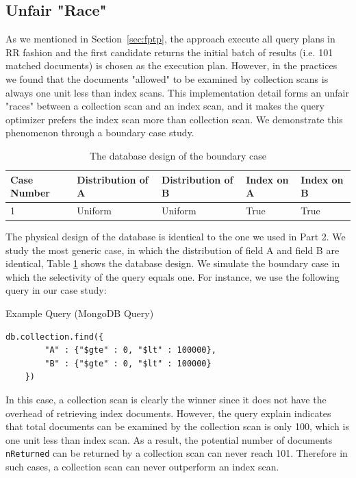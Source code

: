 \subsection{Unfair "Race"}
As we mentioned in Section~\ref{sec:fptp}, the \approachName approach execute all query plans in RR fashion and the first candidate returns the initial batch of results (i.e. 101 matched documents) is chosen as the execution plan. However, in the practices we found that the documents "allowed" to be examined by collection scans is always one unit less than index scans. This implementation detail forms an unfair "races" between a collection scan and an index scan, and it makes the query optimizer prefers the index scan more than collection scan. We demonstrate this phenomenon through a boundary case study. 

\begin{table}[h]
    \begin{tabular}{lllll}
    \toprule
    Case Number & Distribution of A & Distribution of B & Index on A & Index on B \\ 
    \midrule
    1           & Uniform           & Uniform           & True       & True       \\ 
    \bottomrule
    \end{tabular}
    \caption{The database design of the boundary case}
    \label{tbl:irc}
\end{table}


The physical design of the database is identical to the one we used in Part 2. We study the most generic case, in which the distribution of field A and field B are identical, Table \ref{tbl:irc} shows the database design. We simulate the boundary case in which the selectivity of the query equals one. For instance, we use the following query in our case study:

\vspace{0.02\linewidth}
\begin{algorithm}[htbp]
\caption{Example Query (MongoDB Query)}
\begin{verbatim}
db.collection.find({
        "A" : {"$gte" : 0, "$lt" : 100000},
        "B" : {"$gte" : 0, "$lt" : 100000}
    })
\end{verbatim}
\label{query_mongo}
\end{algorithm}


In this case, a collection scan is clearly the winner since it does not have the overhead of retrieving index documents. However, the query explain indicates that total documents can be examined by the collection scan is only 100, which is one unit less than index scan. As a result, the potential number of documents \verb|nReturned| can be returned by a collection scan can never reach 101. Therefore in such cases, a collection scan can never outperform an index scan.

